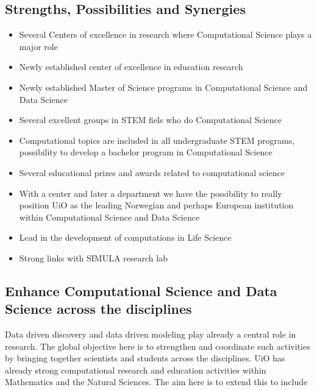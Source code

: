 \documentclass[%
oneside,                 %
final,                   %
10pt]{article}
\begin{document}
\noindent
\subsection*{Strengths, Possibilities and Synergies}

\begin{itemize}
\item Several Centers of excellence in research where Computational Science plays a major role

\item Newly established center of excellence in education research

\item Newly established Master of Science programs in Computational Science and Data Science

\item Several excellent groups in STEM fiels who do Computational Science

\item Computational topics are included in all undergraduate STEM programs, possibility to develop a bachelor program in Computational Science

\item Several educational prizes and awards related to computational science 

\item With a center and later a department we have the possibility to really position UiO as the leading Norwegian and perhaps European institution within Computational Science and Data Science

\item Lead in the development of computations in Life Science

\item Strong links with SIMULA research lab
\end{itemize}

\noindent
\subsection*{Enhance Computational Science and Data Science across the disciplines}

Data driven discovery and data driven modeling play already a central role in research. The global objective here is to strengthen and coordinate such activities by bringing together scientists and students across the disciplines.
UiO has already strong computational research and education activities within Mathematics and the Natural Sciences.
The aim here is to extend this to include
\end{document}
